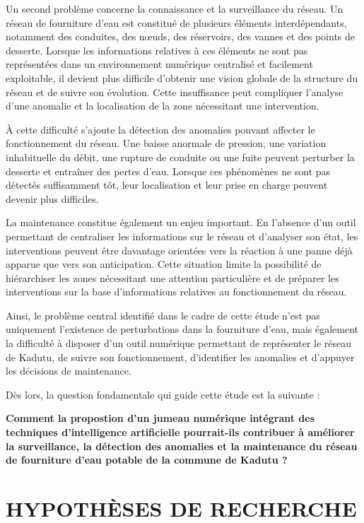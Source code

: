 Un second problème concerne la connaissance et la surveillance du
réseau. Un réseau de fourniture d'eau est constitué de plusieurs
éléments interdépendants, notamment des conduites, des nœuds, des
réservoirs, des vannes et des points de desserte. Lorsque les
informations relatives à ces éléments ne sont pas représentées dans un
environnement numérique centralisé et facilement exploitable, il
devient plus difficile d'obtenir une vision globale de la structure du
réseau et de suivre son évolution. Cette insuffisance peut compliquer
l'analyse d'une anomalie et la localisation de la zone nécessitant une
intervention.

À cette difficulté s'ajoute la détection des anomalies pouvant affecter
le fonctionnement du réseau. Une baisse anormale de pression, une
variation inhabituelle du débit, une rupture de conduite ou une fuite
peuvent perturber la desserte et entraîner des pertes d'eau. Lorsque
ces phénomènes ne sont pas détectés suffisamment tôt, leur localisation
et leur prise en charge peuvent devenir plus difficiles.

La maintenance constitue également un enjeu important. En l'absence
d'un outil permettant de centraliser les informations sur le réseau et
d'analyser son état, les interventions peuvent être davantage orientées
vers la réaction à une panne déjà apparue que vers son anticipation.
Cette situation limite la possibilité de hiérarchiser les zones
nécessitant une attention particulière et de préparer les interventions
sur la base d'informations relatives au fonctionnement du réseau.

Ainsi, le problème central identifié dans le cadre de cette étude n'est
pas uniquement l'existence de perturbations dans la fourniture d'eau,
mais également la difficulté à disposer d'un outil numérique permettant
de représenter le réseau de Kadutu, de suivre son fonctionnement,
d'identifier les anomalies et d'appuyer les décisions de maintenance.

Dès lors, la question fondamentale qui guide cette étude est la
suivante :

\textbf{Comment la propostion d'un jumeau numérique
	intégrant des techniques d'intelligence artificielle pourrait-ils
	contribuer à améliorer la surveillance, la détection des anomalies et
	la maintenance du réseau de fourniture d'eau potable de la commune de
	Kadutu ?}

\section{HYPOTHÈSES DE RECHERCHE}
\label{hypotheses-de-recherche}

